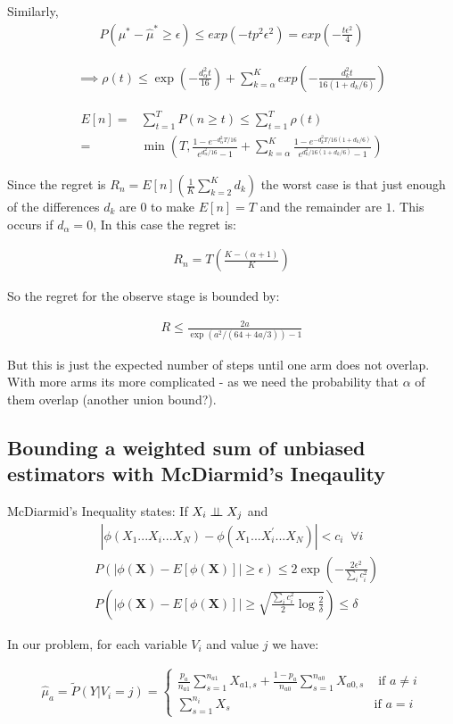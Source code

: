 \documentclass{article}
\newcommand{\eqn}[1]{\begin{align}#1\end{align}}
\theoremstyle{plain}
\theoremstyle{definition}
\begin{document}
Similarly, 
\eqn {
P(\mu^* - \hat{\mu}^* \geq \epsilon) \leq exp(-tp^2\epsilon^2) = exp(-\frac{t\epsilon^2}{4})
}

\eqn {
\implies \rho(t) \leq \exp(-\frac{ d_\alpha^2 t}{16}) + \sum_{k=\alpha}^K exp(-\frac{d_k^2 t}{16(1+d_k/6)})
}


\eqn{ 
E[n] = & \sum_{t=1}^T P(n \geq t) \leq \sum_{t=1}^T \rho(t) \\
= & \min \left(T, \frac{1 - e^{-d_\alpha^2 T/16}}{e^{d_\alpha^2 /16} -1 } +  \sum_{k=\alpha}^K \frac{1 - e^{-d_k^2 T/16(1+d_k/6)}}{e^{d_k^2 /16(1+d_k/6)} -1 } \right)
}

Since the regret is $R_n = E[n]\left(\frac{1}{K}\sum_{k=2}^K d_k \right)$ the worst case is that just enough of the differences $d_k$ are $0$ to make $E[n] = T$ and the remainder are $1$. This occurs if $d_\alpha = 0$, In this case the regret is:

\eqn {
R_n = T \left(\frac{K-(\alpha+1)}{K}\right)
}


So the regret for the observe stage is bounded by:

\eqn {
R \leq \frac{2a}{\exp(a^2/(64+4a/3)) - 1}
}





But this is just the expected number of steps until one arm does not overlap. With more arms its more complicated - as we need the probability that $\alpha$ of them overlap (another union bound?).






\subsection{Bounding a weighted sum of unbiased estimators with McDiarmid's Ineqaulity}

McDiarmid's Inequality states:
If $X_i \perp\!\!\!\perp X_j$ and 
\eqn{
|\phi(X_1...X_i...X_N) - \phi(X_1...X_i^{'}...X_N)| < c_i \;\; \forall i
}
\eqn{
& P\left(|\phi(\boldsymbol{X}) - E[\phi(\boldsymbol{X})]| \geq \epsilon \right) \leq 2 \exp \left(-\frac{2 \epsilon^2}{\sum_{i}c_i^2} \right)\\
\label{eqn:McDiarmid}
& P\left(|\phi(\boldsymbol{X}) - E[\phi(\boldsymbol{X})]| \geq 
\sqrt{\frac{\sum_{i}c_i^2}{2}\log{\frac{2}{\delta}}} 
\right) \leq \delta
}


In our problem, for each variable $V_i$ and value $j$ we have:

\eqn{
\hat{\mu}_a = \tilde{P}(Y|V_i = j)= \begin{cases}
\frac{p_a}{n_{a1}}\sum_{s=1}^{n_{a1}}X_{a1,s} + \frac{1-p_a}{n_{a0}}\sum_{s=1}^{n_{a0}}X_{a0,s} & \text{ if $a \neq i$}\\
\sum_{s=1}^{n_i}X_s & \text{if $a = i$}
\end{cases}
}
\end{document}
